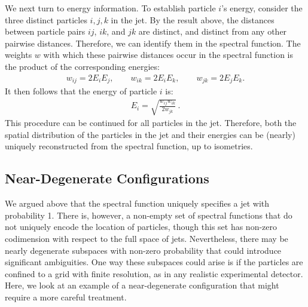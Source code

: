 \documentclass[letterpaper,11pt]{article}
\begin{document}
We next turn to energy information.
%
To establish particle $i$'s energy, consider the three distinct particles $i,j,k$ in the jet.
%
By the result above, the distances between particle pairs $ij$, $ik$, and $jk$ are distinct, and distinct from any other pairwise distances.
%
Therefore, we can identify them in the spectral function.
%
The weights $w$ with which these pairwise distances occur in the spectral function is the product of the corresponding energies:
%
\begin{align}
w_{ij} = 2E_iE_j, \qquad w_{ik} = 2E_iE_k, \qquad w_{jk} = 2E_jE_k.
\end{align}
%
It then follows that the energy of particle $i$ is:
%
\begin{align}
E_i = \sqrt{\frac{w_{ij}w_{ik}}{2w_{jk}}}\,.
\end{align}
This procedure can be continued for all particles in the jet.
%
Therefore, both the spatial distribution of the particles in the jet and their energies can be (nearly) uniquely reconstructed from the spectral function, up to isometries.



\subsection{Near-Degenerate Configurations}

We argued above that the spectral function uniquely specifies a jet with probability 1.
%
There is, however, a non-empty set of spectral functions that do not uniquely encode the location of particles, though this set has non-zero codimension with respect to the full space of jets.
%
Nevertheless, there may be nearly degenerate subspaces with non-zero probability that could introduce significant ambiguities.
%
One way these subspaces could arise is if the particles are confined to a grid with finite resolution, as in any realistic experimental detector.  
%
Here, we look at an example of a near-degenerate configuration that might require a more careful treatment.
\end{document}
